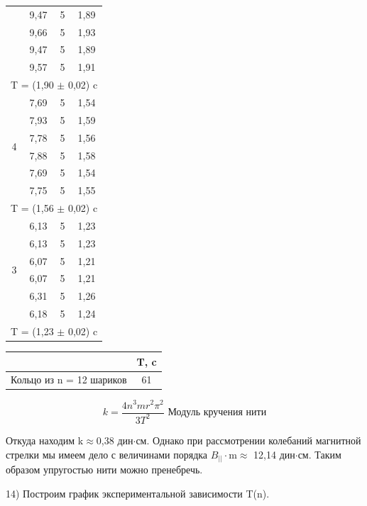 \documentclass[a4paper,12pt]{article}
\begin{document}
\begin{center}
\begin{tabular}{|c|c|c|c|}
     \cline{2-4} & 9,47 & 5 & 1,89 \\
     \cline{2-4} & 9,66 & 5 & 1,93 \\
     \cline{2-4} & 9,47 & 5 & 1,89 \\
     \cline{2-4} & 9,57 & 5 & 1,91 \\
     \hline
     \multicolumn{4}{|c|}{T = (1,90 $\pm$ 0,02) c} \\
     \hline
     \multirow{6}{*}{4} & 7,69 & 5 & 1,54 \\
     \cline{2-4} & 7,93 & 5 & 1,59 \\
     \cline{2-4} & 7,78 & 5 & 1,56 \\
     \cline{2-4} & 7,88 & 5 & 1,58 \\
     \cline{2-4} & 7,69 & 5 & 1,54 \\
     \cline{2-4} & 7,75 & 5 & 1,55 \\
     \hline
     \multicolumn{4}{|c|}{T = (1,56 $\pm$ 0,02) c} \\
     \hline
     \multirow{6}{*}{3} & 6,13 & 5 & 1,23 \\
     \cline{2-4} & 6,13 & 5 & 1,23 \\
     \cline{2-4} & 6,07 & 5 & 1,21 \\
     \cline{2-4} & 6,07 & 5 & 1,21 \\
     \cline{2-4} & 6,31 & 5 & 1,26 \\
     \cline{2-4} & 6,18 & 5 & 1,24 \\
     \hline
     \multicolumn{4}{|c|}{T = (1,23 $\pm$ 0,02) c} \\
     \hline
\end{tabular}
\end{center}

\begin{center}
\begin{tabular}{|c|c|}
	\hline
	& T, c \\
	\hline
	Кольцо из n = 12 шариков & 61 \\
	\hline
\end{tabular}
\end{center}

$$ k = \frac{4n^3mr^2{\pi}^2}{3T^2} \text{ Модуль кручения нити} $$ 

Откуда находим k$\approx$0,38 дин$\cdot$см. Однако при рассмотрении колебаний магнитной стрелки мы имеем дело с величинами порядка $B_{||}\cdot$m$\approx$ 12,14 дин$\cdot$см. Таким образом упругостью нити можно пренебречь. 
 
14) Построим график экспериментальной зависимости T(n).
\end{document}
